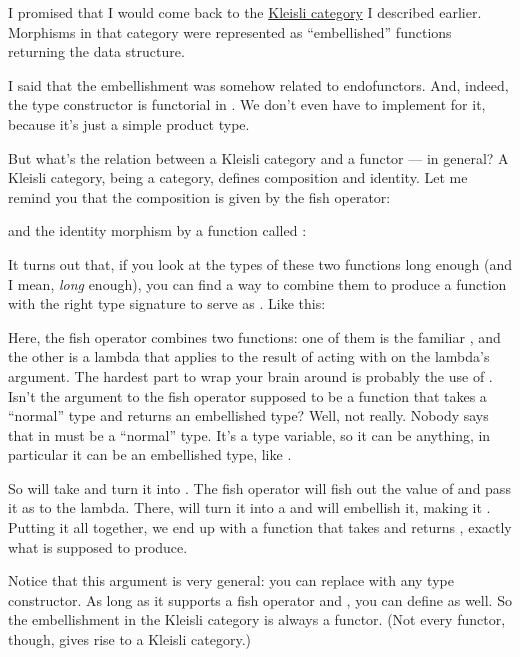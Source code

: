 I promised that I would come back to the \hyperref[kleisli-categories]{Kleisli
  category} I described earlier. Morphisms in that category were
represented as ``embellished'' functions returning the 
data structure.

I said that the embellishment was somehow related to endofunctors. And,
indeed, the  type constructor is functorial in
. We don't even have to implement  for it,
because it's just a simple product type.

But what's the relation between a Kleisli category and a functor --- in
general? A Kleisli category, being a category, defines composition and
identity. Let me remind you that the composition is given by the fish
operator:

and the identity morphism by a function called :

It turns out that, if you look at the types of these two functions long
enough (and I mean, \emph{long} enough), you can find a way to combine
them to produce a function with the right type signature to serve as
. Like this:

Here, the fish operator combines two functions: one of them is the
familiar , and the other is a lambda that applies
 to the result of acting with  on the lambda's
argument. The hardest part to wrap your brain around is probably the use
of . Isn't the argument to the fish operator supposed to be a
function that takes a ``normal'' type and returns an embellished type?
Well, not really. Nobody says that  in
 must be a ``normal'' type. It's a
type variable, so it can be anything, in particular it can be an
embellished type, like .

So  will take  and turn it into
. The fish operator will fish out the value of
 and pass it as  to the lambda. There, 
will turn it into a  and  will embellish it,
making it . Putting it all together, we end up with a
function that takes  and returns ,
exactly what  is supposed to produce.

Notice that this argument is very general: you can replace
 with any type constructor. As long as it supports a fish
operator and , you can define  as well. So
the embellishment in the Kleisli category is always a functor. (Not
every functor, though, gives rise to a Kleisli category.)

